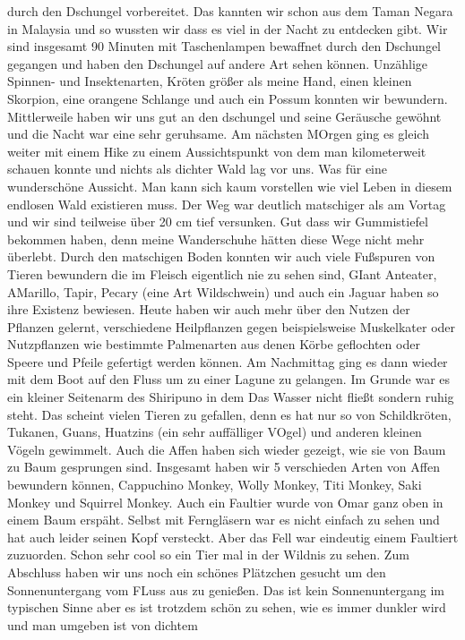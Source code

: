 \documentclass[11pt]{book}
\begin{document}
durch den Dschungel vorbereitet. Das kannten wir schon aus dem Taman Negara in Malaysia und so wussten wir dass es viel in der Nacht zu entdecken gibt. 
Wir sind insgesamt 90 Minuten mit Taschenlampen bewaffnet durch den Dschungel gegangen und haben den Dschungel auf andere Art sehen können. Unzählige 
Spinnen- und Insektenarten, Kröten größer als meine Hand, einen kleinen Skorpion, eine orangene Schlange und auch ein Possum konnten wir bewundern. 
Mittlerweile haben wir uns gut an den dschungel und seine Geräusche gewöhnt und die Nacht war eine sehr geruhsame. 
Am nächsten MOrgen ging es gleich weiter mit einem Hike zu einem Aussichtspunkt von dem man kilometerweit schauen konnte und nichts als dichter Wald 
lag vor uns. Was für eine wunderschöne Aussicht. Man kann sich kaum vorstellen wie viel Leben in diesem endlosen Wald existieren muss. Der Weg war deutlich 
matschiger als am Vortag und wir sind teilweise über 20 cm tief versunken. Gut dass wir Gummistiefel bekommen haben, denn meine Wanderschuhe hätten diese 
Wege nicht mehr überlebt. Durch den matschigen Boden konnten wir auch viele Fußspuren von Tieren bewundern die im Fleisch eigentlich nie zu sehen sind, 
GIant Anteater, AMarillo, Tapir, Pecary (eine Art Wildschwein) und auch ein Jaguar haben so ihre Existenz bewiesen. Heute haben wir auch mehr über den 
Nutzen der Pflanzen gelernt, verschiedene Heilpflanzen gegen beispielsweise Muskelkater oder Nutzpflanzen wie bestimmte Palmenarten aus denen Körbe 
geflochten oder Speere und Pfeile gefertigt werden können. Am Nachmittag ging es dann wieder mit dem Boot auf den Fluss um zu einer Lagune zu gelangen. 
Im Grunde war es ein kleiner Seitenarm des Shiripuno in dem Das Wasser nicht fließt sondern ruhig steht. Das scheint vielen Tieren zu gefallen, denn es hat 
nur so von Schildkröten, Tukanen, Guans, Huatzins (ein sehr auffälliger VOgel) und anderen kleinen Vögeln gewimmelt. Auch die Affen haben sich wieder 
gezeigt, wie sie von Baum zu Baum gesprungen sind. Insgesamt haben wir 5 verschieden Arten von Affen bewundern können, Cappuchino Monkey, Wolly Monkey, 
Titi Monkey, Saki Monkey und Squirrel Monkey. Auch ein Faultier wurde von Omar ganz oben in einem Baum erspäht. Selbst mit Ferngläsern war es nicht 
einfach zu sehen und hat auch leider seinen Kopf versteckt. Aber das Fell war eindeutig einem Faultiert zuzuorden. Schon sehr cool so ein Tier mal 
in der Wildnis zu sehen. Zum Abschluss haben wir uns noch ein schönes Plätzchen gesucht um den Sonnenuntergang vom FLuss aus zu 
genießen. Das ist kein Sonnenuntergang im typischen Sinne aber es ist trotzdem schön zu sehen, wie es immer dunkler wird und man umgeben ist von dichtem 
\end{document}
